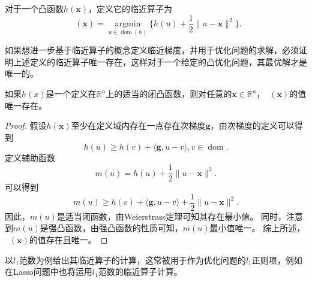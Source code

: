 \begin{definition}
    对于一个凸函数$h(\bm{x})$，定义它的临近算子为
    \begin{equation}
        \mathop{\mathrm{prox_{h}}}(\bm{x}) = \mathop{\mathrm{argmin}}\limits_{u\in \mathop{\mathrm{dom}} (h)}\{h(u)+\frac{1}{2}\|u-\bm{x}\|^{2}\}.
        \nonumber
    \end{equation}
    \label{def_prox_1}
\end{definition}
如果想进一步基于临近算子的概念定义临近梯度，并用于优化问题的求解，必须证明上述定义的临近算子唯一存在，这样对于一个给定的凸优化问题，其最优解才是唯一的。
\begin{theorem}
    如果$h(x)$是一个定义在$\mathbb{R}^{n}$上的适当的闭凸函数，则对任意的$\bm{x}\in \mathbb{R}^{n}$，$\mathop{\mathrm{prox_{h}}}(\bm{x})$的值唯一存在。
    \label{thm_prox_1}
\end{theorem}
\begin{proof}
    假设$h(\bm{x})$至少在定义域内存在一点存在次梯度$\bm{g}$，由次梯度的定义可以得到
    \begin{equation}
        h(u)\geq h(v)+\langle \bm{g}, u-v\rangle, v\in \mathop{\mathrm{dom} (h)}.
    \nonumber
    \end{equation}
定义辅助函数
    \begin{equation}
        m(u)=h(u)+\frac{1}{2}\|u-\bm{x}\|^{2}.
        \nonumber
    \end{equation}
可以得到
    \begin{equation}
        m(u)\geq h(v) + \langle \bm{g}, u-v\rangle + \frac{1}{2}\|u-\bm{x}\|^{2}.
        \nonumber
    \end{equation}
因此，$m(u)$是适当闭函数，由Weierstrass定理可知其存在最小值。
    同时，注意到$m(u)$是强凸函数，由强凸函数的性质可知，$m(u)$最小值唯一。
    综上所述，$\mathop{\mathrm{prox_{h}}}(\bm{x})$的值存在且唯一。
\end{proof}

以$l_{1}$范数为例给出其临近算子的计算，这常被用于作为优化问题的$l_{1}$正则项，例如在Lasso问题中也将运用$l_{1}$范数的临近算子计算。

